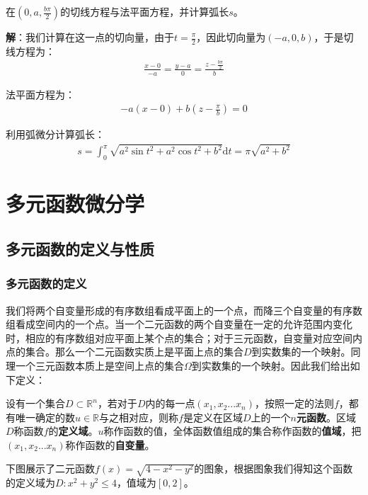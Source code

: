 \documentclass{ctexart}
\let\oldtextbf\textbf %
\renewcommand{\textbf}[1]{\textcolor{btex}{\oldtextbf{#1}}} %
\begin{document}
在$(0,a,\frac{b\pi}{2})$的切线方程与法平面方程，并计算弧长$s$。

\textbf{解}：我们计算在这一点的切向量，由于$t=\frac{\pi}{2}$，因此切向量为$(-a,0,b)$，于是切线方程为：
\begin{align*}
    \frac{x-0}{-a}=\frac{y-a}{0}=\frac{z-\frac{b\pi}{2}}{b}
\end{align*}

法平面方程为：
\begin{align*}
    -a(x-0)+b(z-\frac{\pi}{b})=0
\end{align*}

利用弧微分计算弧长：
\begin{align*}
    s=\int_0^\pi\sqrt{a^2\sin t^2+a^2\cos t^2+b^2}\mathrm{d}t=\pi\sqrt{a^2+b^2}
\end{align*}

\section{多元函数微分学}
\subsection{多元函数的定义与性质}
\subsubsection{多元函数的定义}
我们将两个自变量形成的有序数组看成平面上的一个点，而降三个自变量的有序数组看成空间内的一个点。当一个二元函数的两个自变量在一定的允许范围内变化时，相应的有序数组对应平面上某个点的集合；对于三元函数，自变量对应空间内点的集合。那么一个二元函数实质上是平面上点的集合$D$到实数集的一个映射。同理一个三元函数本质上是空间上点的集合$\Omega$到实数集的一个映射。因此我们给出如下定义：
\begin{tcolorbox}[
    colback=bac2,     %
    colframe=fra2,   %
    coltitle=white,             %
    coltext=tex2,
    title=多元函数的定义,
    fonttitle=\bfseries,        %
arc=3mm,                     %
breakable
]
设有一个集合$D\subset \mathbb{R}^n$，若对于$D$内的每一点$(x_1,x_2...x_n)$，按照一定的法则$f$，都有唯一确定的数$u\in\mathbb{R}$与之相对应，则称$f$是定义在区域$D$上的一个\textbf{$n$元函数}。区域$D$称函数$f$的\textbf{定义域}。$u$称作函数的值，全体函数值组成的集合称作函数的\textbf{值域}，把$(x_1,x_2...x_n)$称作函数的\textbf{自变量}。
\end{tcolorbox}

下图展示了二元函数$f(x)=\sqrt{4-x^2-y^2}$的图象，根据图象我们得知这个函数的定义域为$D:x^2+y^2\leq 4$，值域为$[0,2]$。
\end{document}
